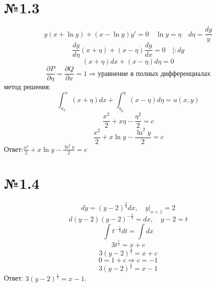 \documentclass{article}
\begin{document}
\section*{№1.3}
\begin{equation*}
    y(x+\ln y)+(x-\ln y)y'=0 \quad \ln y = \eta \quad d\eta=\frac{dy}{y}
\end{equation*}
\begin{equation*}
    \frac{dy}{d\eta}(x+\eta)+(x-\eta)\frac{dy}{dx}=0 \quad |:dy
\end{equation*}
\begin{equation*}
    (x+\eta)dx+(x-\eta)d\eta=0
\end{equation*}
\begin{equation*}
    \frac{\partial P}{\partial \eta}=\frac{\partial Q}{\partial x}=1 \Rightarrow \text{уравнение в полных дифференциалах}
\end{equation*}
метод решения:
\begin{equation*}
    \int_{x_0}^{x}(x+\eta)dx+\int_{\eta_0}^{\eta}(x-\eta)d\eta=u(x,y)
\end{equation*}
\begin{equation*}
    \frac{x^2}{2}+x\eta-\frac{\eta^2}{2}=c
\end{equation*}
\begin{equation*}
    \frac{x^2}{2}+x\ln y-\frac{\ln^2{y}}{2}=c
\end{equation*}
Ответ:$\frac{x^2}{2}+x\ln y-\frac{\ln^2{y}}{2}=c$
\section*{№1.4}
\begin{equation*}
    dy=(y-2)^{\frac{2}{3}}dx,\quad y|_{x=1}=2
\end{equation*}
\begin{equation*}
    d(y-2)(y-2)^{-\frac{2}{3}}=dx, \quad y-2=t
\end{equation*}
\begin{equation*}
    \int t^{-\frac{2}{3}}dt=\int dx
\end{equation*}
\begin{equation*}
    3t^{\frac{1}{3}}=x+c
\end{equation*}
\begin{equation*}
    3(y-2)^{\frac{1}{3}}=x+c
\end{equation*}
\begin{equation*}
    0=1+c \Rightarrow c=-1
\end{equation*}
\begin{equation*}
    3(y-2)^{\frac{1}{3}}=x-1
\end{equation*}
Ответ: $3(y-2)^{\frac{1}{3}}=x-1$.
\end{document}
